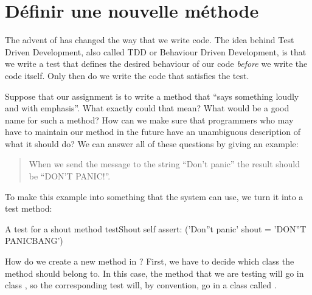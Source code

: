 \documentclass[a4paper,10pt,twoside]{book}
\begin{document}
\section{D\'efinir une nouvelle m\'ethode}

The advent of \cite{Beck03a} has changed the way that we write code.  
The idea behind Test Driven Development, also called TDD or Behaviour Driven Development, is that we write a test that defines the desired behaviour of our code \emph{before} we write the code itself.
Only then do we write the code that satisfies the test.

Suppose that our assignment is to write a method that ``says something loudly and with emphasis''.  What exactly could that mean?  What would be a good name for such a method?  How can we make sure  that programmers who may have to maintain our method in the future have an unambiguous description of what it should do?   We can answer all of these questions by giving an example:

\begin{quote}
When we send the message  to the string ``Don't panic'' the result should be ``DON'T PANIC!''.
\end{quote}

\noindent
To make this example into something that the system can use, we turn it into a test method:

\begin{method}[testShout]{A test for a shout method}
testShout
	self assert: ('Don''t panic' shout = 'DON''T PANICBANG')
\end{method} %

How do we create a new method in \sq?   First, we have to decide which class the method should belong to.
In this case, the  method that we are testing will go in class , so the corresponding test will, by convention, go in a class called .
\end{document}
